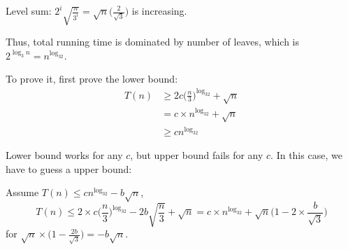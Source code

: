Level sum: $\displaystyle 2^i\sqrt{\frac{n}{3^i}} = \sqrt{n}\bigg(\frac{2}{\sqrt{3}}\bigg)$ is increasing.

Thus, total running time is dominated by number of leaves, which is
$2^{\log_3n}=n^{\log_32}$.

To prove it, first prove the lower bound:
\begin{align*}
    T(n) &\geq 2c\bigg(\frac{n}{3}\bigg)^{\log_32} + \sqrt{n} \\
         &= c \times n^{\log_32} + \sqrt{n} \\
         &\geq cn^{\log_32}
\end{align*}

Lower bound works for any $c$, but upper bound fails for any $c$.
In this case, we have to guess a upper bound:

Assume $T(n) \leq cn^{\log_32} - b\sqrt{n}$,
\[T(n) \leq 2 \times c \bigg(\frac{n}{3}\bigg)^{\log_32} - 2b\sqrt{\frac{n}{3}} + \sqrt{n}
= c \times n^{\log_32} + \sqrt{n}\bigg(1 - 2 \times \frac{b}{\sqrt{3}}\bigg)\]
for $\displaystyle \sqrt{n}\times\bigg(1 - \frac{2b}{\sqrt{3}}\bigg) = -b\sqrt{n}$.

